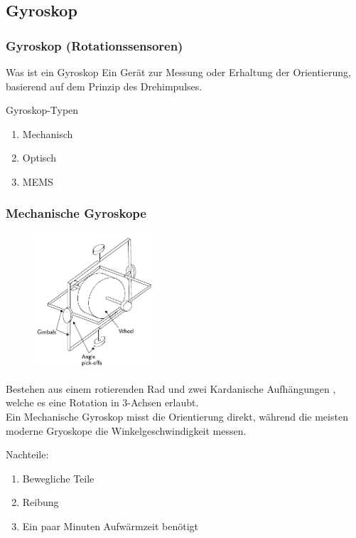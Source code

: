 \documentclass[10pt,a4paper,oneside]{beamer}
\begin{document}
\begin{frame}
  \subsection{Gyroskop}
  \frametitle{Gyroskop (Rotationssensoren)}
  
  \begin{block}{Was ist ein Gyroskop}
  	Ein Gerät zur Messung oder Erhaltung der Orientierung, basierend auf dem Prinzip des Drehimpulses.
  \end{block}
  
  \bigskip
  
  Gyroskop-Typen
  \begin{enumerate}
  	\item Mechanisch
  	\item Optisch 
  	\item MEMS
  \end{enumerate}
\end{frame}

\begin{frame}
	\frametitle{Mechanische Gyroskope}
	\begin{figure}
	\includegraphics[width=0.4\textwidth]{images/mechanical_gyroscope.png} 
	\end{figure}
	
	Bestehen aus einem rotierenden Rad und zwei Kardanische Aufhängungen , welche es eine Rotation in 3-Achsen erlaubt. \\
	Ein Mechanische Gyroskop misst die Orientierung direkt, 
	während die meisten moderne Gryoskope die Winkelgeschwindigkeit messen.
	
	Nachteile:
	\begin{enumerate}
	  	\item Bewegliche Teile
	  	\item Reibung
	  	\item Ein paar Minuten Aufwärmzeit benötigt
	  \end{enumerate}

\end{frame}
\end{document}
